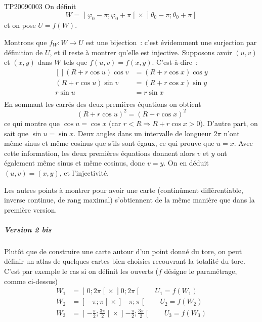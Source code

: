 \begin{corrige}{TP20090003}
On définit
\begin{equation*}
  W = \mathopen]\varphi_0 - \pi; \varphi_0 + \pi\mathclose[
  \times \mathopen]\theta_0 - \pi; \theta_0 + \pi\mathclose[
\end{equation*}
et on pose $U = f(W)$.

Montrons que $f_W : W \to U$ est une bijection~: c'est évidemment
une surjection par définition de $U$, et il reste à montrer qu'elle
est injective. Supposons avoir $(u,v)$ et $(x,y)$ dans $W$ tels que
$f(u,v) = f(x,y)$. C'est-à-dire~:
\begin{equation}
	\begin{aligned}[]
  (R + r\cos u) \cos v 	&= (R + r\cos x) \cos y\\
  (R + r\cos u) \sin v 	&= (R + r\cos x) \sin y \\
  r \sin u		& = r \sin x\\
	\end{aligned}
\end{equation}
En sommant les carrés des deux premières équations on obtient
\begin{equation*}
  (R + r\cos u)^2 = (R + r\cos x)^2
\end{equation*}
ce qui montre que $\cos u = \cos x$ (car $r < R \Rightarrow R + r\cos
x > 0$). D'autre part, on sait que $\sin u = \sin x$. Deux angles dans
un intervalle de longueur $2 \pi$ n'ont même sinus et même cosinus que
s'ils sont égaux, ce qui prouve que $u = x$. Avec cette information,
les deux premières équations donnent alors $v$ et $y$ ont également
même sinus et même cosinus, donc $v = y$. On en déduit $(u,v) =
(x,y)$, et l'injectivité.

Les autres points à montrer pour avoir une carte (continûment
différentiable, inverse continue, de rang maximal) s'obtiennent de la
même manière que dans la première version.

\subparagraph{Version 2 bis}Plutôt que de construire une carte autour
d'un point donné du tore, on peut définir un atlas de quelques cartes
bien choisies recouvrant la totalité du tore. C'est par exemple le cas
si on définit les ouverts ($f$ désigne le paramétrage, comme ci-dessus)
\begin{equation*}
  \begin{split}
    W_1 &= \mathopen]0; 2 \pi\mathclose[ \times \mathopen]0; 2
    \pi\mathclose[ \qquad U_1 = f(W_1)\\
    W_2 &= \mathopen]-\pi; \pi\mathclose[ \times \mathopen]-\pi;
    \pi\mathclose[ \qquad U_2 = f(W_2)\\
    W_3 &= \mathopen]-\frac\pi2; \frac{3\pi}2\mathclose[ \times \mathopen]-\frac\pi2;
    \frac{3\pi}2\mathclose[ \qquad U_3 = f(W_3)\\
  \end{split}
\end{equation*}


\end{corrige}

